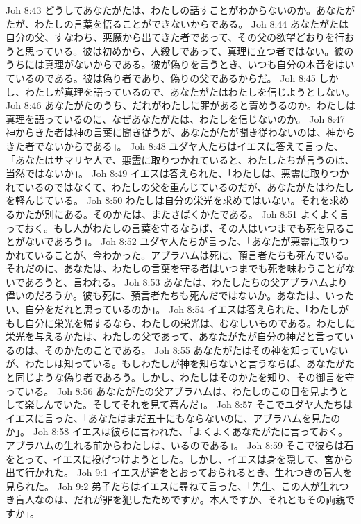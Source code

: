 Joh 8:43  どうしてあなたがたは、わたしの話すことがわからないのか。あなたがたが、わたしの言葉を悟ることができないからである。
Joh 8:44  あなたがたは自分の父、すなわち、悪魔から出てきた者であって、その父の欲望どおりを行おうと思っている。彼は初めから、人殺しであって、真理に立つ者ではない。彼のうちには真理がないからである。彼が偽りを言うとき、いつも自分の本音をはいているのである。彼は偽り者であり、偽りの父であるからだ。
Joh 8:45  しかし、わたしが真理を語っているので、あなたがたはわたしを信じようとしない。
Joh 8:46  あなたがたのうち、だれがわたしに罪があると責めうるのか。わたしは真理を語っているのに、なぜあなたがたは、わたしを信じないのか。
Joh 8:47  神からきた者は神の言葉に聞き従うが、あなたがたが聞き従わないのは、神からきた者でないからである」。
Joh 8:48  ユダヤ人たちはイエスに答えて言った、「あなたはサマリヤ人で、悪霊に取りつかれていると、わたしたちが言うのは、当然ではないか」。
Joh 8:49  イエスは答えられた、「わたしは、悪霊に取りつかれているのではなくて、わたしの父を重んじているのだが、あなたがたはわたしを軽んじている。
Joh 8:50  わたしは自分の栄光を求めてはいない。それを求めるかたが別にある。そのかたは、またさばくかたである。
Joh 8:51  よくよく言っておく。もし人がわたしの言葉を守るならば、その人はいつまでも死を見ることがないであろう」。
Joh 8:52  ユダヤ人たちが言った、「あなたが悪霊に取りつかれていることが、今わかった。アブラハムは死に、預言者たちも死んでいる。それだのに、あなたは、わたしの言葉を守る者はいつまでも死を味わうことがないであろうと、言われる。
Joh 8:53  あなたは、わたしたちの父アブラハムより偉いのだろうか。彼も死に、預言者たちも死んだではないか。あなたは、いったい、自分をだれと思っているのか」。
Joh 8:54  イエスは答えられた、「わたしがもし自分に栄光を帰するなら、わたしの栄光は、むなしいものである。わたしに栄光を与えるかたは、わたしの父であって、あなたがたが自分の神だと言っているのは、そのかたのことである。
Joh 8:55  あなたがたはその神を知っていないが、わたしは知っている。もしわたしが神を知らないと言うならば、あなたがたと同じような偽り者であろう。しかし、わたしはそのかたを知り、その御言を守っている。
Joh 8:56  あなたがたの父アブラハムは、わたしのこの日を見ようとして楽しんでいた。そしてそれを見て喜んだ」。
Joh 8:57  そこでユダヤ人たちはイエスに言った、「あなたはまだ五十にもならないのに、アブラハムを見たのか」。
Joh 8:58  イエスは彼らに言われた、「よくよくあなたがたに言っておく。アブラハムの生れる前からわたしは、いるのである」。
Joh 8:59  そこで彼らは石をとって、イエスに投げつけようとした。しかし、イエスは身を隠して、宮から出て行かれた。
Joh 9:1  イエスが道をとおっておられるとき、生れつきの盲人を見られた。
Joh 9:2  弟子たちはイエスに尋ねて言った、「先生、この人が生れつき盲人なのは、だれが罪を犯したためですか。本人ですか、それともその両親ですか」。
